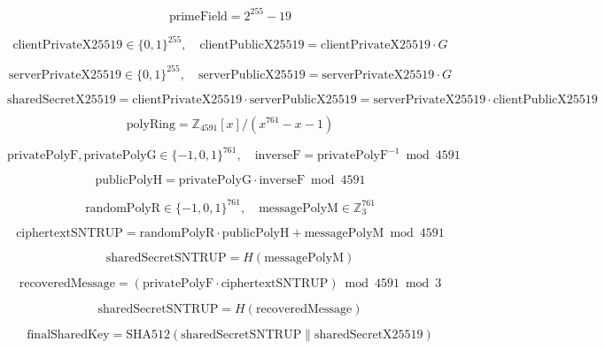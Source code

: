 \documentclass{article}
\begin{document}
\[
\text{primeField} = 2^{255} - 19
\]

\[
\text{clientPrivateX25519} \in \{0,1\}^{255}, \quad \text{clientPublicX25519} = \text{clientPrivateX25519} \cdot G
\]

\[
\text{serverPrivateX25519} \in \{0,1\}^{255}, \quad \text{serverPublicX25519} = \text{serverPrivateX25519} \cdot G
\]

\[
\text{sharedSecretX25519} = \text{clientPrivateX25519} \cdot \text{serverPublicX25519} = \text{serverPrivateX25519} \cdot \text{clientPublicX25519}
\]

\[
\text{polyRing} = \mathbb{Z}_{4591}[x] / (x^{761} - x - 1)
\]

\[
\text{privatePolyF}, \text{privatePolyG} \in \{-1,0,1\}^{761}, \quad \text{inverseF} = \text{privatePolyF}^{-1} \bmod 4591
\]

\[
\text{publicPolyH} = \text{privatePolyG} \cdot \text{inverseF} \bmod 4591
\]

\[
\text{randomPolyR} \in \{-1,0,1\}^{761}, \quad \text{messagePolyM} \in \mathbb{Z}_3^{761}
\]

\[
\text{ciphertextSNTRUP} = \text{randomPolyR} \cdot \text{publicPolyH} + \text{messagePolyM} \bmod 4591
\]

\[
\text{sharedSecretSNTRUP} = H(\text{messagePolyM})
\]

\[
\text{recoveredMessage} = (\text{privatePolyF} \cdot \text{ciphertextSNTRUP}) \bmod 4591 \bmod 3
\]

\[
\text{sharedSecretSNTRUP} = H(\text{recoveredMessage})
\]

\[
\text{finalSharedKey} = \mathrm{SHA512}(\text{sharedSecretSNTRUP} \parallel \text{sharedSecretX25519})
\]
\end{document}

